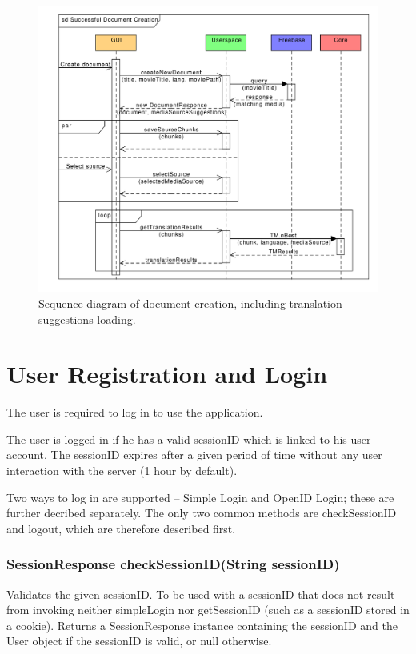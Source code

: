 \begin{figure}[h]
\begin{center}
\includegraphics[scale=0.65]{figures/document_creation_sequence_RPC.pdf}
\end{center}
\caption{Sequence diagram of document creation, including translation suggestions loading.}\label{rpc:sd:document_creation}
\end{figure}

\section{User Registration and Login}
\label{sec:rpc:login}

The user is required to log in to use the application.

The user is logged in if he has a valid sessionID which is linked to his user account.
The sessionID expires after a given period of time without any user interaction with the server (1 hour by default).

Two ways to log in are supported -- Simple Login and OpenID Login; these are further decribed separately. The only two common methods are checkSessionID and logout, which are therefore described first.

\subsubsection{SessionResponse checkSessionID(String sessionID)}
Validates the given sessionID. To be used with a sessionID that does not result from invoking neither simpleLogin nor getSessionID (such as a sessionID stored in a cookie).
Returns a SessionResponse instance containing the sessionID and the User object if the sessionID is valid, or null otherwise.

